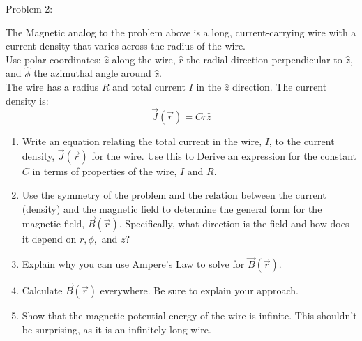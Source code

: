 \begin{Problem}{Problem 2:}
{
The Magnetic analog to the problem above is a long, current‐carrying wire with a current density that varies across the radius of the wire. \\ \newline
\noindent
Use polar coordinates: $\hat{z}$ along the wire, $\hat{r}$ the radial direction
perpendicular to $\hat{z}$, and $\hat{\phi}$ the azimuthal angle around $\hat{z}$. \\ \newline
\noindent
The wire has a radius $R$ and total current $I$ in the $\hat{z}$ direction. The current density is:
\begin{equation*}
\vec{J}(\vec{r}) = Cr\hat{z}
\end{equation*}
\begin{enumerate}[label=(\alph*)]
\item Write an equation relating the total current in the wire, $I$, to the current density, $\vec{J}(\vec{r})$ for the wire. Use this to Derive an expression for the constant $C$ in terms of properties of the wire, $I$ and $R$.
\item Use the symmetry of the problem and the relation between the current (density) and the magnetic field to determine the general form for the magnetic field, $\vec{B}(\vec{r})$. Specifically, what direction is the field and how does it depend on $r, \phi,$ and $z$?
\item Explain why you can use Ampere's Law to solve for $\vec{B}(\vec{r})$.
\item Calculate $\vec{B}(\vec{r})$ everywhere. Be sure to explain your approach.
\item Show that the magnetic potential energy of the wire is infinite. This shouldn't be surprising, as it is an infinitely long wire.
\end{enumerate}
}
\end{Problem}
